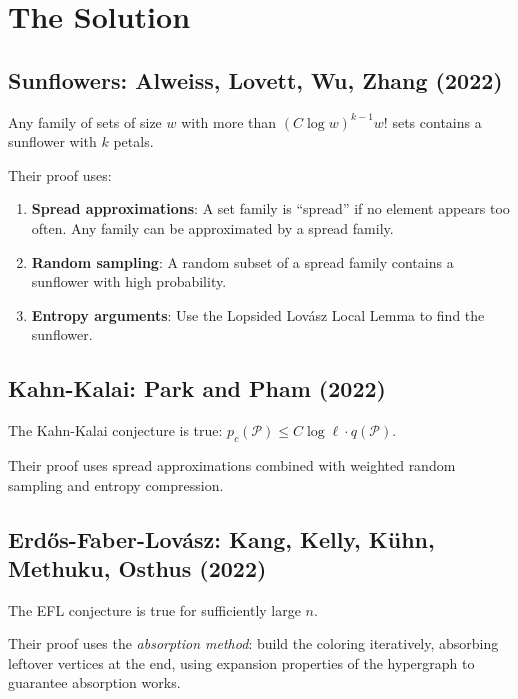 \section{The Solution}

\subsection{Sunflowers: Alweiss, Lovett, Wu, Zhang (2022)}

\begin{theorem}
Any family of sets of size $w$ with more than $(C \log w)^{k-1} w!$ sets contains a sunflower with $k$ petals.
\end{theorem}

Their proof uses:
\begin{enumerate}
\item \textbf{Spread approximations}: A set family is ``spread'' if no element appears too often. Any family can be approximated by a spread family.
\item \textbf{Random sampling}: A random subset of a spread family contains a sunflower with high probability.
\item \textbf{Entropy arguments}: Use the Lopsided Lovász Local Lemma to find the sunflower.
\end{enumerate}

\subsection{Kahn-Kalai: Park and Pham (2022)}

\begin{theorem}
The Kahn-Kalai conjecture is true: $p_c(\mathcal{P}) \le C \log \ell \cdot q(\mathcal{P})$.
\end{theorem}

Their proof uses spread approximations combined with weighted random sampling and entropy compression.

\subsection{Erd\H{o}s-Faber-Lov\'{a}sz: Kang, Kelly, K\"{u}hn, Methuku, Osthus (2022)}

\begin{theorem}
The EFL conjecture is true for sufficiently large $n$.
\end{theorem}

Their proof uses the \emph{absorption method}: build the coloring iteratively, absorbing leftover vertices at the end, using expansion properties of the hypergraph to guarantee absorption works.

